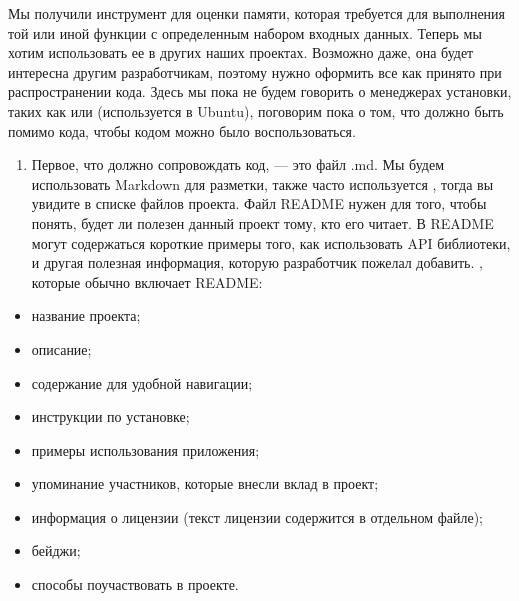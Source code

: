 \documentclass[letterpaper,10pt,russian]{sphinxmanual}
\begin{document}
\sphinxAtStartPar
Мы получили инструмент для оценки памяти, которая требуется для выполнения той или иной функции с определенным набором входных данных. Теперь мы хотим использовать ее в других наших проектах. Возможно даже, она будет интересна другим разработчикам, поэтому нужно оформить все как принято при распространении кода. Здесь мы пока не будем говорить о менеджерах установки, таких как  или  (используется в Ubuntu), поговорим пока о том, что должно быть помимо кода, чтобы кодом можно было воспользоваться.
\begin{enumerate}
%
\item {} 
\sphinxAtStartPar
Первое, что должно сопровождать код, — это файл .md. Мы будем использовать Markdown для разметки, также часто используется , тогда вы увидите  в списке файлов проекта. Файл README нужен для того, чтобы понять, будет ли полезен данный проект тому, кто его читает. В README могут содержаться короткие примеры того, как использовать API библиотеки, и другая полезная информация, которую разработчик пожелал добавить. , которые обычно включает README:

\end{enumerate}
\begin{itemize}
\item {} 
\sphinxAtStartPar
название проекта;

\item {} 
\sphinxAtStartPar
описание;

\item {} 
\sphinxAtStartPar
содержание для удобной навигации;

\item {} 
\sphinxAtStartPar
инструкции по установке;

\item {} 
\sphinxAtStartPar
примеры использования приложения;

\item {} 
\sphinxAtStartPar
упоминание участников, которые внесли вклад в проект;

\item {} 
\sphinxAtStartPar
информация о лицензии (текст лицензии содержится в отдельном файле);

\item {} 
\sphinxAtStartPar
бейджи;

\item {} 
\sphinxAtStartPar
способы поучаствовать в проекте.

\end{itemize}
\end{document}
